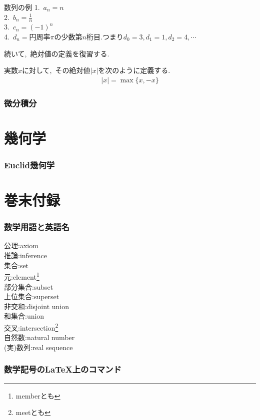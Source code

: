 \documentclass[hyperref,a4paper,12pt]{kininaruki}
\begin{document}
\begin{itembox}[l]{数列の例}
    1.\, $a_{n} = n$\\
    2.\, $b_{n} = \frac{1}{n}$\\
    3.\, $c_{n} = (-1)^{n}$\\
    4.\, $d_{n} = $円周率$\pi$の少数第$n$桁目.つまり$d_{0} = 3,d_{1} = 1,d_{2} = 4,\cdots$
\end{itembox}
続いて,\, 絶対値の定義を復習する.
\begin{shadebox}
    実数$x$に対して,\, その絶対値$|x|$を次のように定義する.
    \begin{align}
        |x| = \max\{x,-x\}
    \end{align}
\end{shadebox}




\newpage
\section{微分積分}
\newpage
\part{幾何学}
\section{Euclid幾何学}
\part{巻末付録}
\section{数学用語と英語名}
\begin{multicols*}{3}
\noindent
\hypertarget{axiom}{公理}:axiom\\
\hypertarget{inference}{推論}:inference\\
\hypertarget{set}{集合}:set\\
\hypertarget{member}{元}:element\footnote{memberとも}\\
\hypertarget{subset}{部分集合}:subset\\
\hypertarget{superset}{上位集合}:superset\\
\hypertarget{dunion}{非交和}:disjoint union\\
\hypertarget{union}{和集合}:union\\
\hypertarget{intersection}{交叉}:intersection\footnote{meetとも}\\
\hypertarget{natural}{自然数}:natural number\\
\hypertarget{real_seq}{(実)数列}:real sequence\\
\end{multicols*}
\newpage
\section{数学記号のLaTeX上のコマンド}
\newpage
{} {}
\printindex
\end{document}
